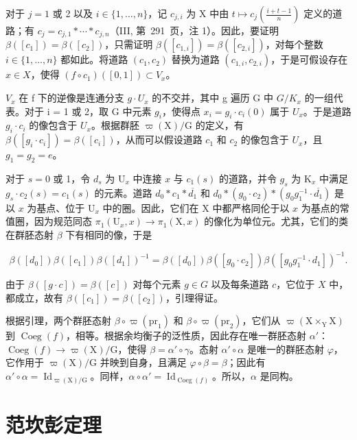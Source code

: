 对于 \(j = 1\) 或 2 以及 \(i \in \{1, \ldots, n\}\)，记 \(c_{j,i}\) 为 X 中由 \(t \mapsto c_j(\frac{i+t-1}{n})\) 定义的道路；有 \(c_j = c_{j,1} * \cdots * c_{j,n}\)（III, 第~291~页，注 1）。因此，要证明 \(\beta([c_1]) = \beta([c_2])\)，只需证明 \(\beta([c_{1,i}]) = \beta([c_{2,i}])\)，对每个整数 \(i \in \{1, \ldots, n\}\) 都如此。将道路 \((c_1, c_2)\) 替换为道路 \((c_{1,i}, c_{2,i})\)，于是可假设存在 \(x \in X\)，使得 \((f \circ c_1)([0,1]) \subset V_x\)。

\(V_{x}\) 在 f 下的逆像是连通分支 \(g \cdot U_{x}\) 的不交并，其中 g 遍历 G 中 \(G/K_{x}\) 的一组代表。对于 i = 1 或 2，取 G 中元素 \(g_{i}\)，使得点 \(x_{i} = g_{i} \cdot c_{i}(0)\) 属于 \(U_{x}\)。于是道路 \(g_{i} \cdot c_{i}\) 的像包含于 \(U_{x}\)。根据群胚 \(\varpi(\mathrm{X})/\mathrm{G}\) 的定义，有 \(\beta([g_{i} \cdot c_{i}]) = \beta([c_{i}])\)，从而可以假设道路 \(c_{1}\) 和 \(c_{2}\) 的像包含于 \(U_{x}\)，且 \(g_{1} = g_{2} = e\)。

对于 \(s=0\) 或 1，令 \(d_{s}\) 为 \(\mathrm{U}_{x}\) 中连接 \(x\) 与 \(c_{1}(s)\) 的道路，并令 \(g_{s}\) 为 \(\mathrm{K}_{x}\) 中满足 \(g_{s}\cdot c_{2}(s)=c_{1}(s)\) 的元素。道路 \(d_{0}*c_{1}*\overline{d_{1}}\) 和 \(d_{0}*(g_{0}\cdot c_{2})*(g_{0}g_{1}^{-1}\cdot\overline{d_{1}})\) 是以 \(x\) 为基点、位于 \(\mathrm{U}_{x}\) 中的圈。因此，它们在 X 中都严格同伦于以 \(x\) 为基点的常值圈，因为规范同态 \(\pi_{1}(\mathrm{U}_{x},x)\to\pi_{1}(\mathrm{X},x)\) 的像化为单位元。尤其，它们的类在群胚态射 \(\beta\) 下有相同的像，于是

\[
\beta ([ d _ {0} ]) \beta ([ c _ {1} ]) \beta ([ d _ {1} ]) ^ {- 1} = \beta ([ d _ {0} ]) \beta ([ g _ {0} \cdot c _ {2} ]) \beta ([ g _ {0} g _ {1} ^ {- 1} \cdot d _ {1} ]) ^ {- 1}.
\]

由于 \(\beta([g \cdot c]) = \beta([c])\) 对每个元素 \(g \in G\) 以及每条道路 \(c\)，它位于 \(X\) 中，都成立，故有 \(\beta([c_1]) = \beta([c_2])\)，引理得证。

根据引理，两个群胚态射 \(\beta \circ \varpi(\mathrm{pr}_{1})\) 和 \(\beta \circ \varpi(\mathrm{pr}_{2})\)，它们从 \(\varpi(\mathrm{X} \times_{\mathrm{Y}} \mathrm{X})\) 到 \(\operatorname{Coeg}(f)\)，相等。根据余均衡子的泛性质，因此存在唯一群胚态射 \(\alpha'\)：\(\operatorname{Coeg}(f) \to \varpi(\mathrm{X})/\mathrm{G}\)，使得 \(\beta = \alpha' \circ \gamma\)。态射 \(\alpha' \circ \alpha\) 是唯一的群胚态射 \(\varphi\)，它作用于 \(\varpi(\mathrm{X})/\mathrm{G}\) 并映到自身，且满足 \(\varphi \circ \beta = \beta\)；因此有 \(\alpha' \circ \alpha = \operatorname{Id}_{\varpi(\mathrm{X})/\mathrm{G}}\)。同样，\(\alpha \circ \alpha' = \operatorname{Id}_{\operatorname{Coeg}(f)}\)。所以，\(\alpha\) 是同构。

\section{范坎彭定理}
